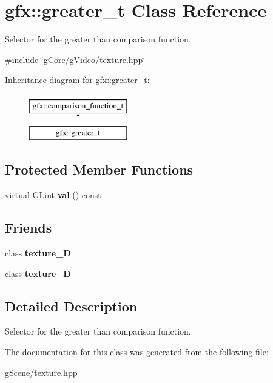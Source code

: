 \hypertarget{classgfx_1_1greater__t}{\section{gfx\-:\-:greater\-\_\-t Class Reference}
\label{classgfx_1_1greater__t}
}


Selector for the greater than comparison function.  




{\ttfamily \#include \char`\"{}g\-Core/g\-Video/texture.\-hpp\char`\"{}}

Inheritance diagram for gfx\-:\-:greater\-\_\-t\-:\begin{figure}[H]
\begin{center}
\leavevmode
\includegraphics[height=2.000000cm]{classgfx_1_1greater__t}
\end{center}
\end{figure}
\subsection*{Protected Member Functions}
\begin{DoxyCompactItemize}
\item 
\hypertarget{classgfx_1_1greater__t_a98b69d70fefdcf5ea50811860928c1a4}{virtual G\-Lint {\bfseries val} () const }\label{classgfx_1_1greater__t_a98b69d70fefdcf5ea50811860928c1a4}

\end{DoxyCompactItemize}
\subsection*{Friends}
\begin{DoxyCompactItemize}
\item 
\hypertarget{classgfx_1_1greater__t_a2039d67f6166ccf823c78e3476aad9aa}{class {\bfseries texture\-\_\-D}}\label{classgfx_1_1greater__t_a2039d67f6166ccf823c78e3476aad9aa}

\item 
\hypertarget{classgfx_1_1greater__t_a22ad86ef46c3b17357a0cd59e50bc7dd}{class {\bfseries texture\-\_\-D}}\label{classgfx_1_1greater__t_a22ad86ef46c3b17357a0cd59e50bc7dd}

\end{DoxyCompactItemize}


\subsection{Detailed Description}
Selector for the greater than comparison function. 

The documentation for this class was generated from the following file\-:\begin{DoxyCompactItemize}
\item 
g\-Scene/texture.\-hpp\end{DoxyCompactItemize}
